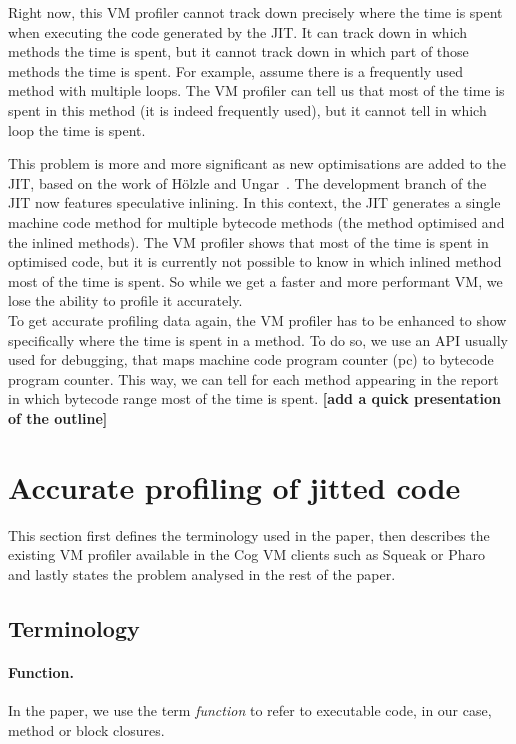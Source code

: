 \documentclass[10pt,preprint,nonatbib]{sigplanconf}
\begin{document}
Right now, this VM profiler cannot track down precisely where the time is spent when executing the code generated by the JIT. It can track down in which methods the time is spent, but it cannot track down in which part of those methods the time is spent. For example, assume there is a frequently used method with multiple loops. The VM profiler can tell us that most of the time is spent in this method (it is indeed frequently used), but it cannot tell in which loop the time is spent.

This problem is more and more significant as new optimisations are added to the JIT, based on the work of H\"olzle and Ungar~\cite{Holz94a}. The development branch of the JIT now features speculative inlining. In this context, the JIT generates a single machine code method for multiple bytecode methods (the method optimised and the inlined methods). The VM profiler shows that most of the time is spent in optimised code, but it is currently not possible to know in which inlined method most of the time is spent. So while we get a faster and more performant VM, we lose the ability to profile it accurately.\\

To get accurate profiling data again, the VM profiler has to be enhanced to show specifically where the time is spent in a method. To do so, we use an API usually used for debugging, that maps machine code program counter (pc) to bytecode program counter. This way, we can tell for each method appearing in the report in which bytecode range most of the time is spent.
\textbf{[add a quick presentation of the outline]}



\section{Accurate profiling of jitted code}

This section first defines the terminology used in the paper, then describes the existing VM profiler available in the Cog VM clients such as Squeak or Pharo and lastly states the problem analysed in the rest of the paper.

\subsection{Terminology}

\paragraph{Function.} In the paper, we use the term \emph{function} to refer to executable code, in our case, method or block closures.
\end{document}

